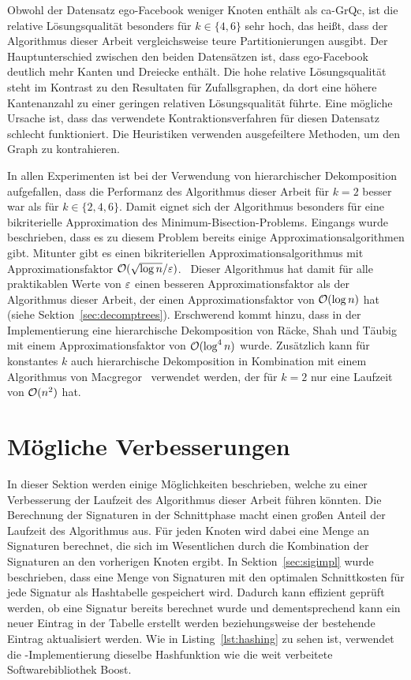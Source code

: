 Obwohl der Datensatz ego-Facebook weniger Knoten enthält als ca-GrQc, ist die relative Lösungsqualität besonders für $k \in \{4,6\}$ sehr hoch, das heißt, dass der Algorithmus dieser Arbeit vergleichsweise teure Partitionierungen ausgibt.
Der Hauptunterschied zwischen den beiden Datensätzen ist, dass ego-Facebook deutlich mehr Kanten und Dreiecke enthält.
Die hohe relative Lösungsqualität steht im Kontrast zu den Resultaten für Zufallsgraphen, da dort eine höhere Kantenanzahl zu einer geringen relativen Lösungsqualität führte.
Eine mögliche Ursache ist, dass das verwendete Kontraktionsverfahren für diesen Datensatz schlecht funktioniert.
Die Heuristiken verwenden ausgefeiltere Methoden, um den Graph zu kontrahieren.

In allen Experimenten ist bei der Verwendung von hierarchischer Dekomposition aufgefallen, dass die Performanz des Algorithmus dieser Arbeit für $k=2$ besser war als für $k \in \{2, 4, 6\}$.
Damit eignet sich der Algorithmus besonders für eine bikriterielle Approximation des Minimum-Bisection-Problems.
Eingangs wurde beschrieben, dass es zu diesem Problem bereits einige Approximationsalgorithmen gibt.
Mitunter gibt es einen bikriteriellen Approximationsalgorithmus mit Approximationsfaktor $\mathcal{O}(\sqrt{\log n}/\varepsilon)$.~\cite{LR99, ARV09}
Dieser Algorithmus hat damit für alle praktikablen Werte von $\varepsilon$ einen besseren Approximationsfaktor als der Algorithmus dieser Arbeit, der einen Approximationsfaktor von $\mathcal{O}(\log n)$ hat (siehe Sektion~\ref{sec:decomptrees}).
Erschwerend kommt hinzu, dass in der Implementierung eine hierarchische Dekomposition von Räcke, Shah und Täubig~\cite{RST14} mit einem Approximationsfaktor von $\mathcal{O}(\log^4 n)$ wurde. 
Zusätzlich kann für konstantes $k$ auch hierarchische Dekomposition in Kombination mit einem Algorithmus von Macgregor~\cite{mcg78} verwendet werden, der für $k=2$ nur eine Laufzeit von $\mathcal{O}(n^2)$ hat.

\section{Mögliche Verbesserungen}\label{sec:improv}
In dieser Sektion werden einige Möglichkeiten beschrieben, welche zu einer Verbesserung der Laufzeit des Algorithmus dieser Arbeit führen könnten.
Die Berechnung der Signaturen in der Schnittphase macht einen großen Anteil der Laufzeit des Algorithmus aus.
Für jeden Knoten wird dabei eine Menge an Signaturen berechnet, die sich im Wesentlichen durch die Kombination der Signaturen an den vorherigen Knoten ergibt.
In Sektion~\ref{sec:sigimpl} wurde beschrieben, dass eine Menge von Signaturen mit den optimalen Schnittkosten für jede Signatur als Hashtabelle gespeichert wird.
Dadurch kann effizient geprüft werden, ob eine Signatur bereits berechnet wurde und dementsprechend kann ein neuer Eintrag in der Tabelle erstellt werden beziehungsweise der bestehende Eintrag aktualisiert werden.
Wie in Listing~\ref{lst:hashing} zu sehen ist, verwendet die \Cpp{}\hyp Implementierung dieselbe Hashfunktion wie die weit verbeitete Softwarebibliothek Boost.

